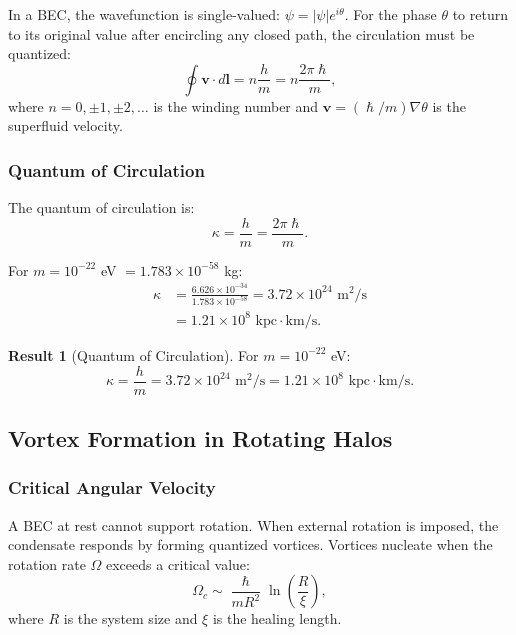 \documentclass[11pt,a4paper]{article}
\newcommand{\hbar}{\ensuremath{\hslash}}
\theoremstyle{definition}
\newtheorem{result}{Result}
\theoremstyle{remark}
\begin{document}
In a BEC, the wavefunction is single-valued: $\psi = |\psi|e^{i\theta}$. For the phase $\theta$ to return to its original value after encircling any closed path, the circulation must be quantized:
\begin{equation}
\label{eq:circulation}
\boxed{\oint \mathbf{v} \cdot d\mathbf{l} = n \frac{h}{m} = n \frac{2\pi\hbar}{m},}
\end{equation}
where $n = 0, \pm 1, \pm 2, \ldots$ is the winding number and $\mathbf{v} = (\hbar/m)\nabla\theta$ is the superfluid velocity.

\subsubsection{Quantum of Circulation}

The quantum of circulation is:
\begin{equation}
\kappa = \frac{h}{m} = \frac{2\pi\hbar}{m}.
\end{equation}

For $m = 10^{-22}$ eV $= 1.783 \times 10^{-58}$ kg:
\begin{align}
\kappa &= \frac{6.626 \times 10^{-34}}{1.783 \times 10^{-58}} = 3.72 \times 10^{24} \text{ m}^2/\text{s} \\
&= 1.21 \times 10^{8} \text{ kpc} \cdot \text{km/s}.
\end{align}

\begin{result}[Quantum of Circulation]
For $m = 10^{-22}$ eV:
\begin{equation}
\boxed{\kappa = \frac{h}{m} = 3.72 \times 10^{24} \text{ m}^2/\text{s} = 1.21 \times 10^8 \text{ kpc}\cdot\text{km/s}.}
\end{equation}
\end{result}

\subsection{Vortex Formation in Rotating Halos}
\label{sec:rotating_halos}

\subsubsection{Critical Angular Velocity}

A BEC at rest cannot support rotation. When external rotation is imposed, the condensate responds by forming quantized vortices. Vortices nucleate when the rotation rate $\Omega$ exceeds a critical value:
\begin{equation}
\Omega_c \sim \frac{\hbar}{mR^2} \ln\left(\frac{R}{\xi}\right),
\end{equation}
where $R$ is the system size and $\xi$ is the healing length.
\end{document}
